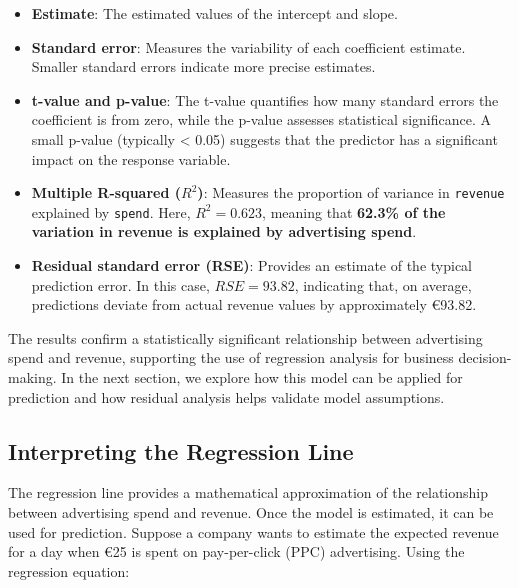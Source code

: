 \documentclass[
]{book}
\newcommand{\passthrough}[1]{#1}
\providecommand{\tightlist}{%
  \setlength{\itemsep}{0pt}\setlength{\parskip}{0pt}}
\theoremstyle{definition}
\theoremstyle{definition}
\theoremstyle{definition}
\theoremstyle{definition}
\theoremstyle{remark}
\begin{document}
\begin{itemize}
\tightlist
\item
  \textbf{Estimate}: The estimated values of the intercept and slope.\\
\item
  \textbf{Standard error}: Measures the variability of each coefficient estimate. Smaller standard errors indicate more precise estimates.\\
\item
  \textbf{t-value and p-value}: The t-value quantifies how many standard errors the coefficient is from zero, while the p-value assesses statistical significance. A small p-value (typically \textless{} 0.05) suggests that the predictor has a significant impact on the response variable.\\
\item
  \textbf{Multiple R-squared (\(R^2\))}: Measures the proportion of variance in \passthrough{\lstinline!revenue!} explained by \passthrough{\lstinline!spend!}. Here, \(R^2 = 0.623\), meaning that \textbf{62.3\% of the variation in revenue is explained by advertising spend}.\\
\item
  \textbf{Residual standard error (RSE)}: Provides an estimate of the typical prediction error. In this case, \(RSE = 93.82\), indicating that, on average, predictions deviate from actual revenue values by approximately €93.82.
\end{itemize}

The results confirm a statistically significant relationship between advertising spend and revenue, supporting the use of regression analysis for business decision-making. In the next section, we explore how this model can be applied for prediction and how residual analysis helps validate model assumptions.

\subsection*{Interpreting the Regression Line}\label{interpreting-the-regression-line}

The regression line provides a mathematical approximation of the relationship between advertising spend and revenue. Once the model is estimated, it can be used for prediction. Suppose a company wants to estimate the expected revenue for a day when €25 is spent on pay-per-click (PPC) advertising. Using the regression equation:
\end{document}
